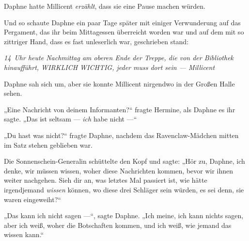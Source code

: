 Daphne hatte Millicent \emph{erzählt}, dass sie eine Pause machen würden.

Und so schaute Daphne ein paar Tage später mit einiger Verwunderung auf das Pergament, das ihr beim Mittagessen überreicht worden war und auf dem mit so zittriger Hand, dass es fast unleserlich war, geschrieben stand:

\emph{14~Uhr heute Nachmittag am oberen Ende der Treppe, die von der Bibliothek hinaufführt, WIRKLICH WICHTIG, jeder muss dort sein — Millicent}

Daphne sah sich um, aber sie konnte Millicent nirgendwo in der Großen Halle sehen.

„Eine Nachricht von deinem Informanten?“ fragte Hermine, als Daphne es ihr sagte.
„Das ist seltsam — \emph{ich} habe nicht —“

„Du hast was nicht?“ fragte Daphne, nachdem das Ravenclaw-Mädchen mitten im Satz stehen geblieben war.

Die Sonnenschein-Generalin schüttelte den Kopf und sagte:
„Hör zu, Daphne, ich denke, wir müssen wissen, woher diese Nachrichten kommen, bevor wir ihnen weiter nachgehen. Sieh dir an, was letztes Mal passiert ist, wie hätte irgendjemand \emph{wissen} können, wo diese drei Schläger sein würden, es sei denn, sie waren eingeweiht?“

„Das kann ich nicht sagen —“, sagte Daphne.
„Ich meine, ich kann nichts sagen, aber ich weiß, woher die Botschaften kommen, und ich weiß, wie jemand das wissen kann.“

